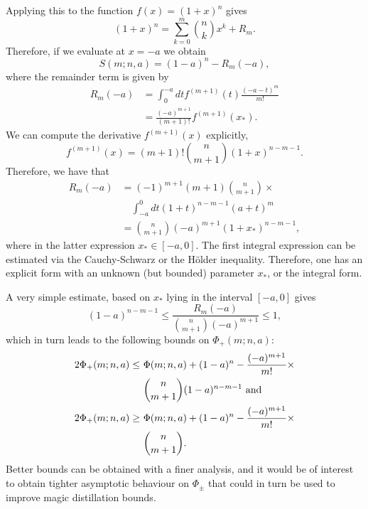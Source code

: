 \documentclass[pra,
aps,
twocolumn,
superscriptaddress,
groupedaddress,
nofootinbib,
reprint
]{revtex4-1}
\begin{document}
Applying this to the function $f(x) = (1+x)^n$ gives
\begin{equation}
	(1+x)^n = \sum_{k=0}^m \binom{n}{k} x^k + R_m.
\end{equation}
Therefore, if we evaluate at $x=-a$ we obtain
\begin{equation}
	S(m; n, a) = (1-a)^n - R_m(-a),
\end{equation}
where the remainder term is given by
\begin{align}
	R_m(-a) &= \int_0^{-a} dt f^{(m+1)}(t) \frac{(-a-t)^m}{m!} \\
&= \frac{(-a)^{m+1}}{(m+1)!} f^{(m+1)}(x_*).
\end{align}
We can compute the derivative $f^{(m+1)}(x)$ explicitly,
\begin{equation}
	f^{(m+1)}(x) = (m+1)!\binom{n}{m+1}(1+x)^{n-m-1}.
\end{equation}
Therefore, we have that
\begin{align}
	R_m(-a) &= (-1)^{m+1}(m+1)\binom{n}{m+1}\times \nonumber\\
	&\hspace{12pt} \int_{-a}^0 dt (1+t)^{n-m-1}(a+t)^m \\
&= \binom{n}{m+1}(-a)^{m+1}(1+x_*)^{n-m-1},
\end{align}
where in the latter expression $x_* \in [-a,0]$. 
The first integral expression can be estimated via the Cauchy-Schwarz or the H{\"o}lder inequality. 
Therefore, one has an explicit form with an unknown (but bounded) parameter $x_*$, or the integral form.

A very simple estimate, based on $x_*$ lying in the interval $[-a,0]$ gives
\begin{equation}
(1-a)^{n-m-1} \leq \frac{R_m(-a)}{\binom{n}{m+1}(-a)^{m+1}} \leq 1,
\end{equation}
which in turn leads to the following bounds on $\Phi_+(m; n, a)$:
\begin{align}
	\hspace{-2cm}2\Phi_+(m; n, a) \leq\ &\Phi(m; n, a) + (1-a)^n - \frac{(-a)^{m+1}}{m!} \times \nonumber\\
	 &\binom{n}{m+1} (1-a)^{n-m-1} \text{ and} \\
	2\Phi_+(m; n, a) \geq\ &\Phi(m; n, a) + (1-a)^n - \frac{(-a)^{m+1}}{m!}  \times \nonumber\\
	 &\binom{n}{m+1} .
\end{align}
Better bounds can be obtained with a finer analysis, and it would be of interest to obtain tighter asymptotic behaviour on $\Phi_{\pm}$ that could in turn be used to improve magic distillation bounds.
\end{document}
